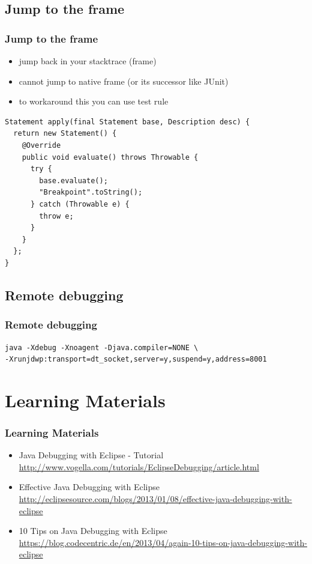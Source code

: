 \documentclass{beamer}
\begin{document}
\subsection{Jump to the frame}
\begin{frame}[fragile]
\frametitle{Jump to the frame}
\begin{itemize}
\item jump back in your stacktrace (frame)
\item cannot jump to native frame (or its successor like JUnit)
  \pause
\item to workaround this you can use test rule
\end{itemize}
\vspace{0.2cm}
\begin{lstlisting}
Statement apply(final Statement base, Description desc) {
  return new Statement() {
    @Override
    public void evaluate() throws Throwable {
      try {
        base.evaluate();
        "Breakpoint".toString();
      } catch (Throwable e) {
        throw e;
      }
    }
  };
}
\end{lstlisting}
\end{frame}

\subsection{Remote debugging}
\begin{frame}[fragile]
\frametitle{Remote debugging}
\begin{lstlisting}
java -Xdebug -Xnoagent -Djava.compiler=NONE \
-Xrunjdwp:transport=dt_socket,server=y,suspend=y,address=8001
\end{lstlisting}
\end{frame}

\section{Learning Materials}
\begin{frame}[fragile]
\frametitle{Learning Materials}
\begin{itemize}
\item Java Debugging with Eclipse - Tutorial\\\url{http://www.vogella.com/tutorials/EclipseDebugging/article.html}
\item Effective Java Debugging with Eclipse\\\url{http://eclipsesource.com/blogs/2013/01/08/effective-java-debugging-with-eclipse}
\item 10 Tips on Java Debugging with Eclipse\\\url{https://blog.codecentric.de/en/2013/04/again-10-tips-on-java-debugging-with-eclipse}
\end{itemize}
\end{frame}
\end{document}
